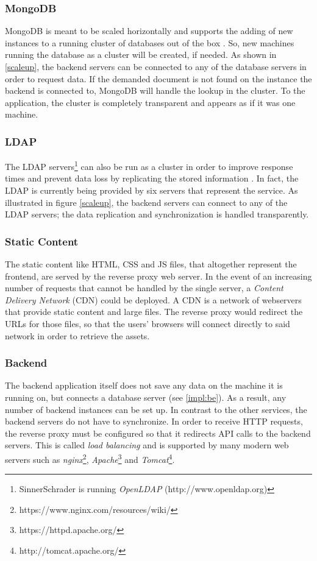 \newpage
\subsubsection{MongoDB}
MongoDB is meant to be scaled horizontally and supports the adding of new instances to a running cluster of databases out of the box \cite[p. 19]{MongoGuide}. So, new machines running the database as a cluster will be created, if needed. As shown in \ref{scaleup}, the backend servers can be connected to any of the database servers in order to request data. If the demanded document is not found on the instance the backend is connected to, MongoDB will handle the lookup in the cluster. To the application, the cluster is completely transparent and appears as if it was one machine.

\subsubsection{LDAP}
The LDAP servers\footnote{SinnerSchrader is running \textit{OpenLDAP} (http://www.openldap.org)} can also be run as a cluster in order to improve response times and prevent data loss by replicating the stored information \cite{ldapscale}. In fact, the LDAP is currently being provided by six servers that represent the service. As illustrated in figure \ref{scaleup}, the backend servers can connect to any of the LDAP servers; the data replication and synchronization is handled transparently.

\subsubsection{Static Content}
The static content like HTML, CSS and JS files, that altogether represent the frontend, are
served by the reverse proxy web server. In the event of an increasing number of requests that cannot be handled by the single server, a \textit{Content Delivery Network} (CDN) could be deployed. A CDN is a network of webservers that provide static content and large files. The reverse proxy would redirect the URLs for those files, so that the users' browsers will connect directly to said network in order to retrieve the assets.

\subsubsection{Backend}
The backend application itself does not save any data on the machine it is running on, but connects a database server (see \ref{impl:be}). As a result, any number of backend instances can be set up. In contrast to the other services, the backend servers do not have to synchronize. In order to receive HTTP requests, the reverse proxy must be configured so that it redirects API calls to the backend servers. This is called \textit{load balancing} and is supported by many modern web servers such as \textit{nginx}\footnote{https://www.nginx.com/resources/wiki/}, \textit{Apache}\footnote{https://httpd.apache.org/} and \textit{Tomcat}\footnote{http://tomcat.apache.org/}.

